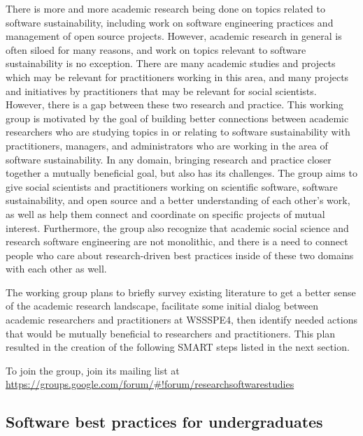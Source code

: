 \documentclass[11pt, oneside]{amsart}
\newcommand{\note}[1]{ {\textcolor{blueish}    { ***Note:      #1 }}}
\begin{document}
There is more and more academic research being done on topics related to software sustainability, including work on software engineering practices and management of open source projects. However, academic research in general is often siloed for many reasons, and work on topics relevant to software sustainability is no exception. There are many academic studies and projects which may be relevant for practitioners working in this area, and many projects and initiatives by practitioners that may be relevant for social scientists. However, there is a gap between these two research and practice. 
%
This working group is motivated by the goal of building better connections between academic researchers who are studying topics in or relating to software sustainability with practitioners, managers, and administrators who are working in the area of software sustainability.
%
 In any domain, bringing research and practice closer together a mutually beneficial goal, but also has its challenges. 
The group aims to give social scientists and practitioners working on scientific software, software sustainability, and open source and a better understanding of each other's work, as well as help them connect and coordinate on specific projects of mutual interest.
%
Furthermore, the group also recognize that academic social science and research software engineering are not monolithic, and there is a need to connect people who care about research-driven best practices inside of these two domains with each other as well.

The working group plans to briefly survey existing literature to get a better sense of the academic research landscape, facilitate some initial dialog between academic researchers and practitioners at WSSSPE4, then identify needed actions that would be mutually beneficial to researchers and practitioners. This plan resulted in the creation of the following SMART steps listed in the next section.


To join the group, join its mailing list at \url{https://groups.google.com/forum/#!forum/researchsoftwarestudies}


\subsection{Software best practices for undergraduates}
\label{sec:best-practices-undergrads}

\end{document}
